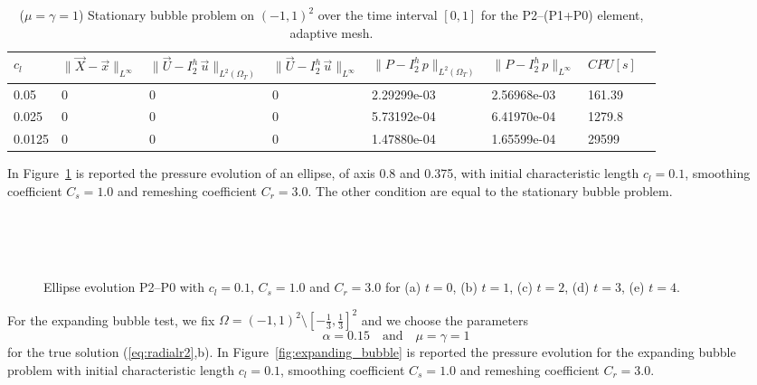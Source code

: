 \documentclass[a4paper,12pt,onecolumn]{article}
\newcommand{\errorXx}{\|\vec{X} - \vec{x}\|_{L^\infty}}
\newcommand{\LerrorUu}[1]{\|\vec U - I^h_{#1}\,\vec u\|_{L^2(\Omega_T)}}
\newcommand{\errorUu}[1]{\|\vec U - I^h_{#1}\,\vec u\|_{L^\infty}}
\newcommand{\errorPp}[1]{\|P - I^h_{#1}\,p\|_{L^\infty}}
\newcommand{\LerrorPp}[1]{\|P - I^h_{#1}\,p\|_{L^2(\Omega_T)}}
\begin{document}
\begin{table}
 \center
 \hspace*{-2cm}
\begin{tabular}{llllllll}
\hline
$c_l$ & $\errorXx$ & $\LerrorUu2$ & $\errorUu2$ & $\LerrorPp2$ & $\errorPp2$ & $CPU[s]$ \\
\hline
0.05 & 0 & 0 & 0 & 2.29299e-03 & 2.56968e-03 & 161.39\\
0.025 & 0 & 0 & 0 & 5.73192e-04 & 6.41970e-04 & 1279.8\\
0.0125 & 0 & 0 & 0 & 1.47880e-04 & 1.65599e-04 & 29599\\
\hline
\end{tabular}
\hspace*{-2cm}
\caption{($\mu=\gamma=1$) Stationary bubble problem on $(-1,1)^2$ over the time interval $[0,1]$ for the P2--(P1+P0) element, adaptive mesh.}
\label{tab:bubble2Dp2p1p0adaptive}
\end{table}

In Figure~\ref{fig:ellipse} is reported the pressure evolution of an ellipse, of axis 0.8 and 0.375, with initial characteristic length $c_l=0.1$, smoothing coefficient $C_s=1.0$ and remeshing coefficient $C_r=3.0$. The other condition are equal to the stationary bubble problem.

\begin{figure}[htbp]
  \centering
  \\
  \quad
  \\
  \quad
  \\
  \caption{Ellipse evolution P2--P0 with $c_l=0.1$, $C_s=1.0$ and $C_r=3.0$ for (a) $t=0$, (b) $t=1$, (c) $t=2$, (d) $t=3$, (e) $t=4$.}
  \label{fig:ellipse}
\end{figure}

For the expanding bubble test, we fix $\Omega = (-1,1)^2 \setminus [-\frac13,\frac13]^2$ and we choose the parameters
\begin{equation*}
\alpha = 0.15 \quad\text{and}\quad \mu = \gamma = 1
\end{equation*}
for the true solution (\ref{eq:radialr2},b). In Figure~\ref{fig:expanding_bubble} is reported the pressure evolution for the expanding bubble problem with initial characteristic length $c_l=0.1$, smoothing coefficient $C_s=1.0$ and remeshing coefficient $C_r=3.0$.
\end{document}
